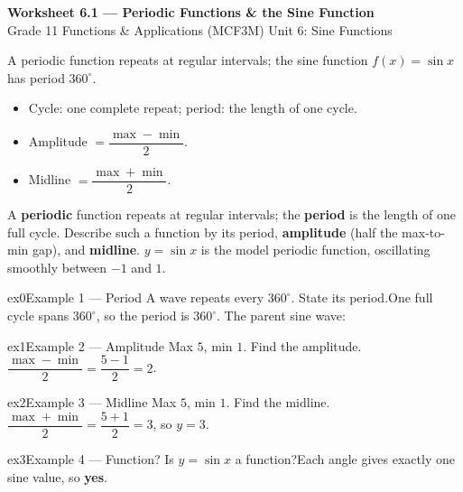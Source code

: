 \documentclass[11pt]{article}
\begin{document}
\begin{center}
{\LARGE\bfseries\color{titleblue}Worksheet 6.1 --- Periodic Functions \& the Sine Function}\\[2pt]
{\small Grade 11 Functions \& Applications (MCF3M) \textperiodcentered{} Unit 6: Sine Functions}
\end{center}

\begin{ideabox}
A periodic function repeats at regular intervals; the sine function $f(x)=\sin x$ has period $360^\circ$.
\begin{itemize}[leftmargin=*,itemsep=2pt]
  \item Cycle: one complete repeat; period: the length of one cycle.
  \item Amplitude $=\dfrac{\max-\min}{2}$.
  \item Midline $=\dfrac{\max+\min}{2}$.
\end{itemize}
\end{ideabox}

\begin{learnbox}
A \textbf{periodic} function repeats at regular intervals; the \textbf{period} is the length of one full cycle.
Describe such a function by its period, \textbf{amplitude} (half the max-to-min gap), and \textbf{midline}.
$y=\sin x$ is the model periodic function, oscillating smoothly between $-1$ and $1$.
\end{learnbox}


\begin{example}{ex0}{Example 1 --- Period}
A wave repeats every $360^\circ$. State its period.\soln One full cycle spans $360^\circ$, so the period is $360^\circ$. The parent sine wave:
\end{example}

\begin{example}{ex1}{Example 2 --- Amplitude}
Max $5$, min $1$. Find the amplitude.\soln $\dfrac{\max-\min}{2}=\dfrac{5-1}{2}=2$.
\end{example}

\begin{example}{ex2}{Example 3 --- Midline}
Max $5$, min $1$. Find the midline.\soln $\dfrac{\max+\min}{2}=\dfrac{5+1}{2}=3$, so $y=3$.
\end{example}

\begin{example}{ex3}{Example 4 --- Function?}
Is $y=\sin x$ a function?\soln Each angle gives exactly one sine value, so \textbf{yes}.
\end{example}
\end{document}
